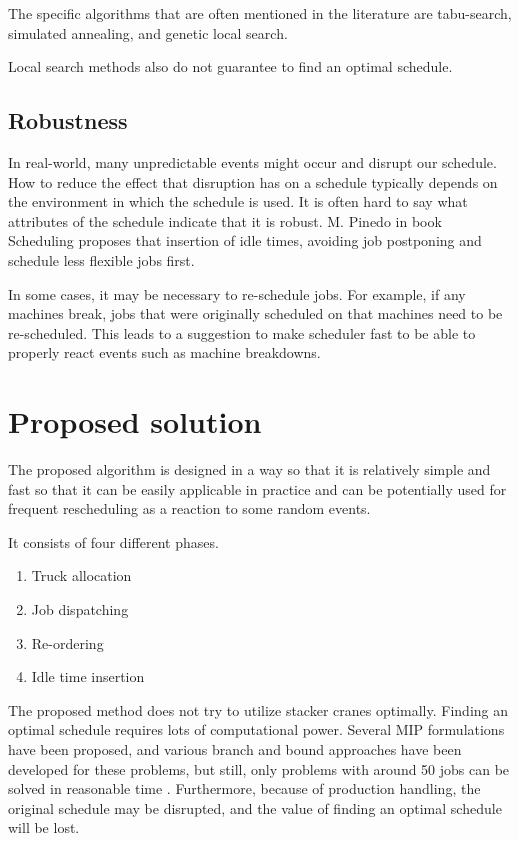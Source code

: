 \documentclass{ctuthesis}
\begin{document}
The specific algorithms that are often mentioned in the literature are tabu-search, simulated annealing, and genetic local search.

Local search methods also do not guarantee to find an optimal schedule.

\section{Robustness}

In real-world, many unpredictable events might occur and disrupt our schedule. How to reduce the effect that disruption has on a schedule typically depends on the environment in which the schedule is used. It is often hard to say what attributes of the schedule indicate that it is robust. M. Pinedo in book Scheduling \cite{pinedo} proposes that insertion of idle times, avoiding job postponing and schedule less flexible jobs first.

In some cases, it may be necessary to re-schedule jobs. For example, if any machines break, jobs that were originally scheduled on that machines need to be re-scheduled. This leads to a suggestion to make scheduler fast to be able to properly react events such as machine breakdowns.
\chapter{Proposed solution}
\label{ch:Proposed solution}

The proposed algorithm is designed in a way so that it is relatively simple and fast so that it can be easily applicable in practice and can be potentially used for frequent rescheduling as a reaction to some random events.

It consists of four different phases.

\begin{enumerate}
    \item Truck allocation
    \item Job dispatching
    \item Re-ordering
    \item Idle time insertion
\end{enumerate}

The proposed method does not try to utilize stacker cranes optimally. Finding an optimal schedule requires lots of computational power. Several MIP formulations have been proposed, and various branch and bound approaches have been developed for these problems, but still, only problems with around 50 jobs can be solved in reasonable time \cite{pinedo}. Furthermore, because of production handling, the original schedule may be disrupted, and the value of finding an optimal schedule will be lost. 
\end{document}
